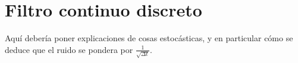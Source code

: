 \chapter{Filtro continuo discreto} \label{anexo:dt}

Aquí debería poner explicaciones de cosas estocásticas, y en particular cómo se deduce que el ruido se pondera por \(\frac{1}{\sqrt{\Delta t}}\).
